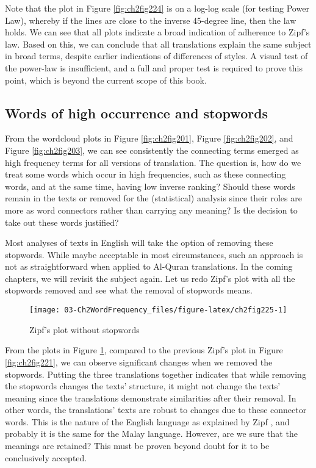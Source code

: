 \documentclass[
]{article}
\begin{document}
Note that the plot in Figure \ref{fig:ch2fig224} is on a log-log scale (for testing Power Law), whereby if the lines are close to the inverse 45-degree line, then the law holds. We can see that all plots indicate a broad indication of adherence to Zipf's law. Based on this, we can conclude that all translations explain the same subject in broad terms, despite earlier indications of differences of styles. A visual test of the power-law is insufficient, and a full and proper test is required to prove this point, which is beyond the current scope of this book.

\hypertarget{words-of-high-occurrence-and-stopwords}{%
\subsection{Words of high occurrence and stopwords}\label{words-of-high-occurrence-and-stopwords}}

From the wordcloud plots in Figure \ref{fig:ch2fig201}, Figure \ref{fig:ch2fig202}, and Figure \ref{fig:ch2fig203}, we can see consistently the connecting terms emerged as high frequency terms for all versions of translation. The question is, how do we treat some words which occur in high frequencies, such as these connecting words, and at the same time, having low inverse ranking? Should these words remain in the texts or removed for the (statistical) analysis since their roles are more as word connectors rather than carrying any meaning? Is the decision to take out these words justified?

Most analyses of texts in English will take the option of removing these stopwords. While maybe acceptable in most circumstances, such an approach is not as straightforward when applied to Al-Quran translations. In the coming chapters, we will revisit the subject again. Let us redo Zipf's plot with all the stopwords removed and see what the removal of stopwords means.

\begin{figure}

{\centering \texttt{[image: 03-Ch2WordFrequency\_files/figure-latex/ch2fig225-1]} 

}

\caption{Zipf's plot without stopwords}\label{fig:ch2fig225}
\end{figure}

From the plots in Figure \ref{fig:ch2fig225}, compared to the previous Zipf's plot in Figure \ref{fig:ch2fig221}, we can observe significant changes when we removed the stopwords. Putting the three translations together indicates that while removing the stopwords changes the texts' structure, it might not change the texts' meaning since the translations demonstrate similarities after their removal. In other words, the translations' texts are robust to changes due to these connector words. This is the nature of the English language as explained by Zipf \citep{zipf1949}, and probably it is the same for the Malay language. However, are we sure that the meanings are retained? This must be proven beyond doubt for it to be conclusively accepted.
\end{document}
